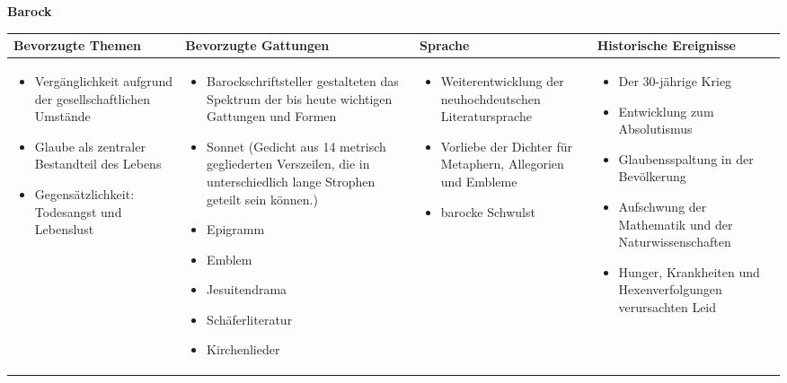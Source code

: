 \documentclass[12pt,a3paper,landscape]{report}
\begin{document}
	\thispagestyle{empty}
	\noindent
	\Huge
	\textbf{Barock} \\[0.75cm]
	\Large
	\begin{tabularx}{\textwidth}{|X|X|X|X|}
		\hline
		\textbf{Bevorzugte Themen} & \textbf{Bevorzugte Gattungen} & \textbf{Sprache} &\textbf{Historische Ereignisse} \\
		\hline
		\begin{itemize}
			\item Vergänglichkeit aufgrund der gesellschaftlichen Umstände
			\item Glaube als zentraler Bestandteil des Lebens
			\item Gegensätzlichkeit: Todesangst und Lebenslust
		\end{itemize} &
		\begin{itemize}
			\item Barockschriftsteller gestalteten das Spektrum der bis heute wichtigen Gattungen und Formen
			\item Sonnet (Gedicht aus 14 metrisch gegliederten Verszeilen, die in unterschiedlich lange Strophen geteilt sein können.)
			\item Epigramm
			\item Emblem
			\item Jesuitendrama
			\item Schäferliteratur
			\item Kirchenlieder
		\end{itemize} &
		\begin{itemize}
			\item Weiterentwicklung der neuhochdeutschen Literatursprache
			\item Vorliebe der Dichter für Metaphern, Allegorien und Embleme
			\item barocke Schwulst
		\end{itemize} &
		\begin{itemize}
			\item Der 30-jährige Krieg
			\item Entwicklung zum Absolutismus
			\item Glaubensspaltung in der Bevölkerung
			\item Aufschwung der Mathematik und der Naturwissenschaften
			\item Hunger, Krankheiten und Hexenverfolgungen verursachten Leid
		\end{itemize}
		\\
		\hline
	\end{tabularx}
\end{document}
